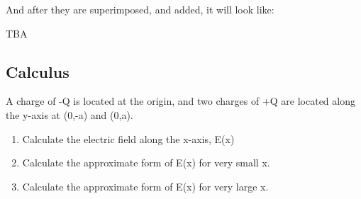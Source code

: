\begin{solution}
And after they are superimposed, and added, it will look like:

\begin{center}


TBA
\end{center}

\end{solution}



\subsection*{Calculus}

\begin{question}
A charge of -Q is located at the origin, and two charges of +Q are located along the y-axis at (0,-a) and (0,a).

\begin{enumerate}[label=(\alph*)]
    \item Calculate the electric field along the x-axis, E(x)
    \item Calculate the approximate form of E(x) for very small x.
    \item Calculate the approximate form of E(x) for very large x.
\end{enumerate}
\end{question}

